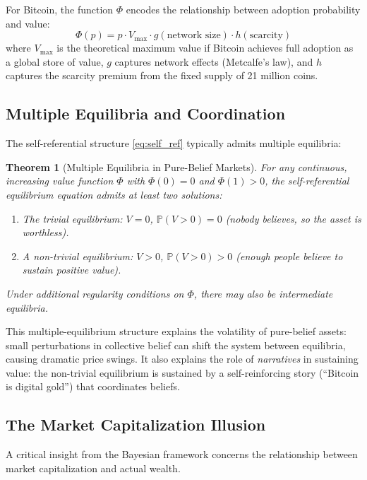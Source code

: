 \documentclass[12pt,a4paper]{article}
\newtheorem{theorem}{Theorem}[section]
\theoremstyle{definition}
\newcommand{\Prob}{\mathbb{P}}
\begin{document}
For Bitcoin, the function $\Phi$ encodes the relationship between adoption probability and value:
\begin{equation}\label{eq:bitcoin_phi}
    \Phi(p) = p \cdot V_{\text{max}} \cdot g(\text{network size}) \cdot h(\text{scarcity})
\end{equation}
where $V_{\text{max}}$ is the theoretical maximum value if Bitcoin achieves full adoption as a global store of value, $g$ captures network effects (Metcalfe's law), and $h$ captures the scarcity premium from the fixed supply of 21 million coins.

\subsection{Multiple Equilibria and Coordination}

The self-referential structure \eqref{eq:self_ref} typically admits multiple equilibria:

\begin{theorem}[Multiple Equilibria in Pure-Belief Markets]\label{thm:multiple_eq}
For any continuous, increasing value function $\Phi$ with $\Phi(0) = 0$ and $\Phi(1) > 0$, the self-referential equilibrium equation admits at least two solutions:
\begin{enumerate}[label=(\roman*)]
    \item The \emph{trivial equilibrium}: $V = 0$, $\Prob(V > 0) = 0$ (nobody believes, so the asset is worthless).
    \item A \emph{non-trivial equilibrium}: $V > 0$, $\Prob(V > 0) > 0$ (enough people believe to sustain positive value).
\end{enumerate}
Under additional regularity conditions on $\Phi$, there may also be intermediate equilibria.
\end{theorem}

This multiple-equilibrium structure explains the volatility of pure-belief assets: small perturbations in collective belief can shift the system between equilibria, causing dramatic price swings. It also explains the role of \emph{narratives} in sustaining value: the non-trivial equilibrium is sustained by a self-reinforcing story (``Bitcoin is digital gold'') that coordinates beliefs.

\subsection{The Market Capitalization Illusion}

A critical insight from the Bayesian framework concerns the relationship between market capitalization and actual wealth.
\end{document}
